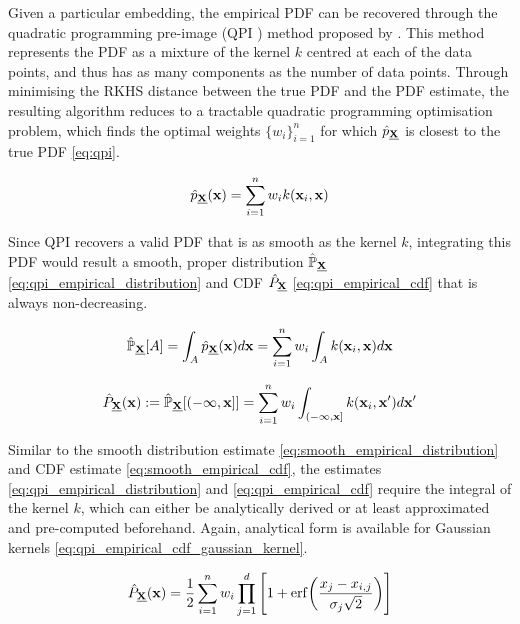 \documentclass[twoside]{article} \usepackage{aistats2017}
\theoremstyle{definition}
\theoremstyle{remark}
\newcommand{\rv}[1]{\underline{#1}}
\newcommand{\qpi}{QPI }
\begin{document}
	Given a particular embedding, the empirical PDF can be recovered through the quadratic programming pre-image (\qpi) method proposed by \cite{McCalman2013}. This method represents the PDF as a mixture of the kernel $k$ centred at each of the data points, and thus has as many components as the number of data points. Through minimising the RKHS distance between the true PDF and the PDF estimate, the resulting algorithm reduces to a tractable quadratic programming optimisation problem, which finds the optimal weights $\{w_{i}\}_{i = 1}^{n}$ for which $\hat{p}_{\bvec{\rv{X}}}$ is closest to the true PDF \eqref{eq:qpi}. 
	
	\begin{equation}
		\hat{p}_{\bvec{\rv{X}}}(\bvec{x}) = \sum_{i = 1}^{n} w_{i} k(\bvec{x}_{i}, \bvec{x})
	\label{eq:qpi}
	\end{equation}

	Since \qpi recovers a valid PDF that is as smooth as the kernel $k$, integrating this PDF would result a smooth, proper distribution $\hat{\mathbb{P}}_{\bvec{\rv{X}}}$ \eqref{eq:qpi_empirical_distribution} and CDF $\hat{P}_{\bvec{\rv{X}}}$ \eqref{eq:qpi_empirical_cdf} that is always non-decreasing.
	
	\begin{equation}
		\hat{\mathbb{P}}_{\bvec{\rv{X}}}[A] = \int_{A} \hat{p}_{\bvec{\rv{X}}}(\bvec{x}) d\bvec{x} = \sum_{i = 1}^{n} w_{i} \int_{A} k(\bvec{x}_{i}, \bvec{x}) d\bvec{x}
	\label{eq:qpi_empirical_distribution}
	\end{equation}
	
	\begin{equation}
		\hat{P}_{\bvec{\rv{X}}}(\bvec{x}) := \hat{\mathbb{P}}_{\bvec{\rv{X}}}[(-\bvec{\infty}, \bvec{x}]] = \sum_{i = 1}^{n} w_{i} \int_{(-\bvec{\infty}, \bvec{x}]} k(\bvec{x}_{i}, \bvec{x}') d\bvec{x}'
	\label{eq:qpi_empirical_cdf}
	\end{equation}
	
	Similar to the smooth distribution estimate \eqref{eq:smooth_empirical_distribution} and CDF estimate \eqref{eq:smooth_empirical_cdf}, the estimates \eqref{eq:qpi_empirical_distribution} and \eqref{eq:qpi_empirical_cdf} require the integral of the kernel $k$, which can either be analytically derived or at least approximated and pre-computed beforehand. Again, analytical form is available for Gaussian kernels \eqref{eq:qpi_empirical_cdf_gaussian_kernel}.
	
	\begin{equation}
		\hat{P}_{\bvec{\rv{X}}}(\bvec{x}) = \frac{1}{2} \sum_{i = 1}^{n} w_{i} \prod_{j = 1}^{d} \Bigg[1 + \mathrm{erf}\bigg(\frac{x_{j} - x_{i, j}}{\sigma_{j} \sqrt{2}}\bigg)\Bigg]
	\label{eq:qpi_empirical_cdf_gaussian_kernel}
	\end{equation}
	
\end{document}

